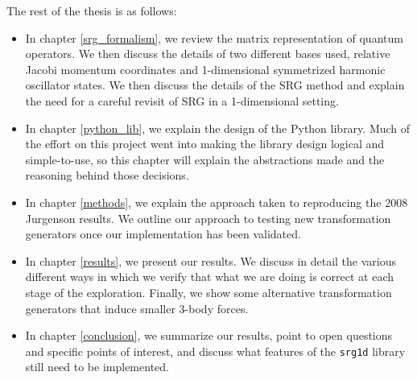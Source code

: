 The rest of the thesis is as follows:
\begin{itemize}
    \item{In chapter \ref{srg_formalism}, we review the matrix representation of quantum operators. We then discuss the details of two different bases used, relative Jacobi momentum coordinates and 1-dimensional symmetrized harmonic oscillator states. We then discuss the details of the SRG method and explain the need for a careful revisit of SRG in a 1-dimensional setting.}
    \item{In chapter \ref{python_lib}, we explain the design of the Python library. Much of the effort on this project went into making the library design logical and simple-to-use, so this chapter will explain the abstractions made and the reasoning behind those decisions.}
    \item{In chapter \ref{methods}, we explain the approach taken to reproducing the 2008 Jurgenson results. We outline our approach to testing new transformation generators once our implementation has been validated.}
    \item{In chapter \ref{results}, we present our results. We discuss in detail the various different ways in which we verify that what we are doing is correct at each stage of the exploration. Finally, we show some alternative transformation generators that induce smaller 3-body forces.}
    \item{In chapter \ref{conclusion}, we summarize our results, point to open questions and specific points of interest, and discuss what features of the \texttt{srg1d} library still need to be implemented.}
\end{itemize}

